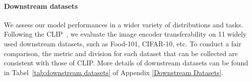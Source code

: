 

\paragraph{Downstream datasets} 


We assess our model performances in a wider variety of distributions and tasks. Following the CLIP~\citep{radford2021learning},  we evaluate the image encoder transferability on 11 widely used downstream datasets, such as Food-101, CIFAR-10, etc. 
To conduct a fair comparison, the metric and division for each dataset that can be collected are consistent with those of CLIP. More details of downstream datasets can be found in Tabel~\ref{tab:downstream datasets} of Appendix \ref{Downstream Datasets}.

